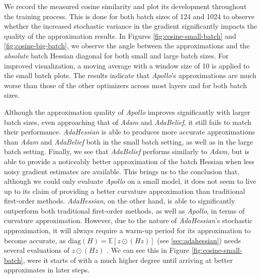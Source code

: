 We record the measured cosine similarity and plot its development throughout the training process.
This is done for both batch sizes of 124 and 1024 to observe whether the increased stochastic variance in the gradient significantly impacts the quality of the approximation results.
In Figures \ref{fig:cosine-small-batch} and \ref{fig:cosine-big-batch}, we observe the angle between the approximations
and the \emph{absolute} batch Hessian diagonal for both small and large batch sizes.
For improved visualization, a moving average with a window size of 10 is applied to the small batch plots.
The results indicate that \emph{Apollo}'s approximations are much worse than those of the other optimizers across most layers and for both batch sizes.

Although the approximation quality of \emph{Apollo} improves significantly with larger batch sizes, even approaching that of \emph{Adam} and \emph{AdaBelief},
it still fails to match their performance.
\emph{AdaHessian} is able to produces more accurate approximations than \emph{Adam} and \emph{AdaBelief} both in the small batch setting,
as well as in the large batch setting.
Finally, we see that \emph{AdaBelief} performs similarly to \emph{Adam}, but is able to provide a noticeably better approximation of the batch Hessian when less noisy gradient estimates are available.
This brings us to the conclusion that, although we could only evaluate \emph{Apollo} on a small model,
it does not seem to live up to its claim of providing a better curvature approximation than traditional first-order methods.
\emph{AdaHessian}, on the other hand, is able to significantly outperform both traditional first-order methods, as well as \emph{Apollo},
in terms of curvature approximation.
However, due to the nature of \emph{AdaHessian}'s stochastic approximation, it will always require a warm-up period for its approximation to become accurate,
as $ \text{diag}(H) = \mathbb{E}[z \odot (Hz)]$ (see \ref{sec:adahessian}) needs several evaluations of $z \odot (Hz)$ . We can see this in Figure \ref{fig:cosine-small-batch},
were it starts of with a much higher degree until arriving at better approximates in later steps.


